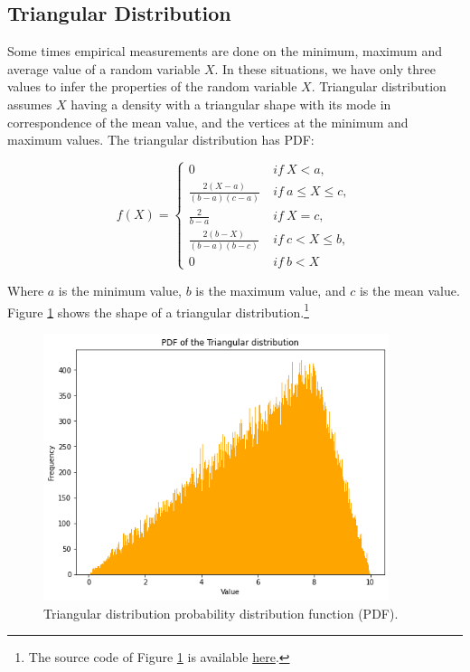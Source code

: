 \subsection{Triangular Distribution}
Some times empirical measurements are done on the minimum, maximum and average value of a random variable $X$. In these situations, we have only three values to infer the properties of the random variable $X$. Triangular distribution assumes $X$ having a density with a triangular shape with its mode in correspondence of the mean value, and the vertices at the minimum and maximum values. The triangular distribution has PDF:

\begin{equation}
f(X)=\left\{
                \begin{array}{ll}
                  0\ \ & if\ X<a,\\
                  \frac{2(X-a)}{(b-a)(c-a)}\ & if\ a\le X\le c,\\
                  \frac{2}{b-a}\ & if\ X=c,\\
                  \frac{2(b-X)}{(b-a)(b-c)}\ & if\ c<X\le b,\\
                  0\ & if\ b<X
                \end{array}
              \right.
\label{eq_triangularDF}
\end{equation}

Where $a$ is the minimum value, $b$ is the maximum value, and $c$ is the mean value. Figure \ref{fig_triangular} shows the shape of a triangular distribution.\footnote{The source code of Figure \ref{fig_triangular} is available \href{https://github.com/aletuf93/logproj/blob/master/examples/03.\%20Statistics.ipynb}{here}.
}

\begin{figure}[hbt!]
\centering
\includegraphics[width=0.9\textwidth]{SectionLetsMath/elemStat_figures/fig_triangular.png}
\captionsetup{type=figure}
\caption{Triangular distribution probability distribution function (PDF).}
\label{fig_triangular}
\end{figure}

